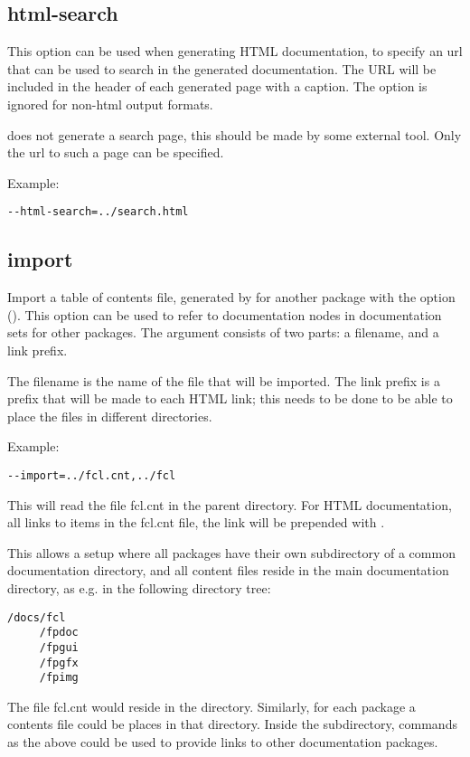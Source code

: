 \subsection{html-search}
\label{suse:htmlsearch}
This option can be used when generating HTML documentation, to specify an
url that can be used to search in the generated documentation. The URL will be
included in the header of each generated page with a  caption.
The option is ignored for non-html output formats.

\fpdoc does not generate a search page, this should be made by some external
tool. Only the url to such a page can be specified.

Example:
\begin{verbatim}
--html-search=../search.html
\end{verbatim}

\subsection{import}
\label{suse:import}
Import a table of contents file, generated by \fpdoc for another package
with the  option (). This option can be used 
to refer to documentation nodes in documentation sets for other packages. 
The argument consists of two parts: a filename, and a link prefix. 

The filename is the name of the file that will be imported. The link
prefix is a prefix that will be made to each HTML link; this needs to be
done to be able to place the files in different directories.

Example:
\begin{verbatim}
--import=../fcl.cnt,../fcl
\end{verbatim}
This will read the file fcl.cnt in the parent directory. For HTML
documentation, all links to items in the fcl.cnt file, the link will be
prepended with .

This allows a setup where all packages have their own subdirectory of a
common documentation directory, and all content files reside in the main
documentation directory, as e.g. in the following directory tree:
\begin{verbatim}
/docs/fcl
     /fpdoc
     /fpgui
     /fpgfx
     /fpimg
\end{verbatim}
The file fcl.cnt would reside in the  directory. Similarly, for
each package a contents file  could be places in that
directory. Inside the subdirectory, commands as the above could be used to
provide links to other documentation packages.

